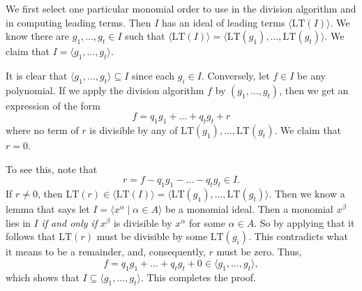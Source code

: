 \documentclass[11pt]{article}
\begin{document}
We first select one particular monomial order to use in the division algorithm and in computing leading terms. Then \( I \) has an ideal of leading terms \( \langle \text{LT}(I) \rangle \). We know there are \( g_1, \dots, g_t \in I \) such that \( \langle \text{LT}(I) \rangle = \langle \text{LT}(g_1), \dots, \text{LT}(g_t) \rangle \). We claim that \( I = \langle g_1, \dots, g_t \rangle \).

It is clear that \( \langle g_1, \dots, g_t \rangle \subseteq I \) since each \( g_i \in I \). Conversely, let \( f \in I \) be any polynomial. If we apply the division algorithm  \( f \) by \( (g_1, \dots, g_t) \), then we get an expression of the form
\[
f = q_1 g_1 + \dots + q_t g_t + r
\]
where no term of \( r \) is divisible by any of \( \text{LT}(g_1), \dots, \text{LT}(g_t) \). We claim that \( r = 0 \). 

To see this, note that
\[
r = f - q_1 g_1 - \dots - q_t g_t \in I.
\]
If \( r \neq 0 \), then \( \text{LT}(r) \in \langle \text{LT}(I) \rangle = \langle \text{LT}(g_1), \dots, \text{LT}(g_t) \rangle \). Then we know a lemma that says let $I = \langle x^\alpha \mid \alpha \in A\rangle$ be a monomial ideal. Then a monomial $x^\beta $ lies in $I$ \textit{if and only if} $x^\beta$ is divisible by $x^\alpha$ for some $\alpha \in A$. So by applying that it follows that \( \text{LT}(r) \) must be divisible by some \( \text{LT}(g_i) \). This contradicts what it means to be a remainder, and, consequently, \( r \) must be zero. Thus,
\[
f = q_1 g_1 + \dots + q_t g_t + 0 \in \langle g_1, \dots, g_t \rangle,
\]
which shows that \( I \subseteq \langle g_1, \dots, g_t \rangle \). This completes the proof. 
\end{document}
